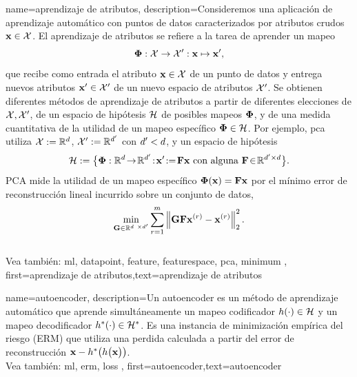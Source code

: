 {name={aprendizaje de atributos},
	description={Consideremos una aplicación de aprendizaje automático con puntos de datos caracterizados por 
	atributos crudos ${\bf x} \in \mathcal{X}$. El aprendizaje de atributos
	se refiere a la tarea de aprender un mapeo
		$${\bf \Phi}: \mathcal{X} \rightarrow \mathcal{X}': {\bf x} \mapsto {\bf x}',$$ 
		que recibe como entrada el atributo ${\bf x} \in \mathcal{X}$ de un punto de datos y entrega nuevos
		atributos ${\bf x}' \in \mathcal{X}'$ de un nuevo espacio de atributos $\mathcal{X}'$. 
		Se obtienen diferentes métodos de aprendizaje de atributos a partir de diferentes elecciones de 
		$\mathcal{X},\mathcal{X}'$, de un espacio de hipótesis $\mathcal{H}$ de posibles mapeos ${\bf \Phi}$, 
		y de una medida cuantitativa de la utilidad de un mapeo específico ${\bf \Phi} \in \mathcal{H}$. Por ejemplo, pca utiliza $\mathcal{X} := \mathbb{R}^{d}$, $\mathcal{X}' := \mathbb{R}^{d'}$
		con $d' < d$, y un espacio de hipótesis
		$$\hypospace\defeq \big\{ \featuremapvec: \mathbb{R}^{\dimlocalmodel}
		\!\rightarrow\! \mathbb{R}^{\dimlocalmodel'}\!:\!\featurevec'\!\defeq\!\mF \featurevec \mbox{ con alguna } \mF \!\in\! \mathbb{R}^{\dimlocalmodel' \times \dimlocalmodel} \big\}.$$ PCA mide la utilidad de un mapeo específico ${\bf \Phi}({\bf x})= \mathbf{F} {\bf x}$ 
		por el mínimo error de reconstrucción lineal incurrido sobre un conjunto de datos, 
	$$ \min_{\mG \in \mathbb{R}^{\dimlocalmodel \times \dimlocalmodel'}} \sum_{\sampleidx=1}^{\samplesize} \normgeneric{\mG \mF \featurevec^{(\sampleidx)} - \featurevec^{(\sampleidx)}}{2}^{2}.$$ 
	\\
		Vea también: \gls{ml}, \gls{datapoint}, \gls{feature}, \gls{featurespace}, \gls{pca}, \gls{minimum} }, 
	first={aprendizaje de atributos},text={aprendizaje de atributos}
} 

{name={autoencoder},
	description={Un autoencoder es un método de aprendizaje automático que aprende simultáneamente un mapeo codificador
		$h(\cdot) \in \mathcal{H}$ y un mapeo decodificador $h^{*}(\cdot) \in \mathcal{H}^{*}$. 
		Es una instancia de minimización empírica del riesgo (ERM) que utiliza una perdida calculada a partir del error de reconstrucción 
		${\bf x} - h^{*}\big(  h \big( {\bf x} \big) \big)$.
		\\
		Vea también: \gls{ml}, \gls{erm}, \gls{loss} },
	first={autoencoder},text={autoencoder}
} 

